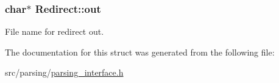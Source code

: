 \subsubsection[{\texorpdfstring{out}{out}}]{\setlength{\rightskip}{0pt plus 5cm}char$\ast$ Redirect\+::out}\hypertarget{structRedirect_a9d5efc0a96275e13eba0e71450771952}{}\label{structRedirect_a9d5efc0a96275e13eba0e71450771952}
File name for redirect out. 

The documentation for this struct was generated from the following file\+:\begin{DoxyCompactItemize}
\item 
src/parsing/\hyperlink{parsing__interface_8h}{parsing\+\_\+interface.\+h}\end{DoxyCompactItemize}
